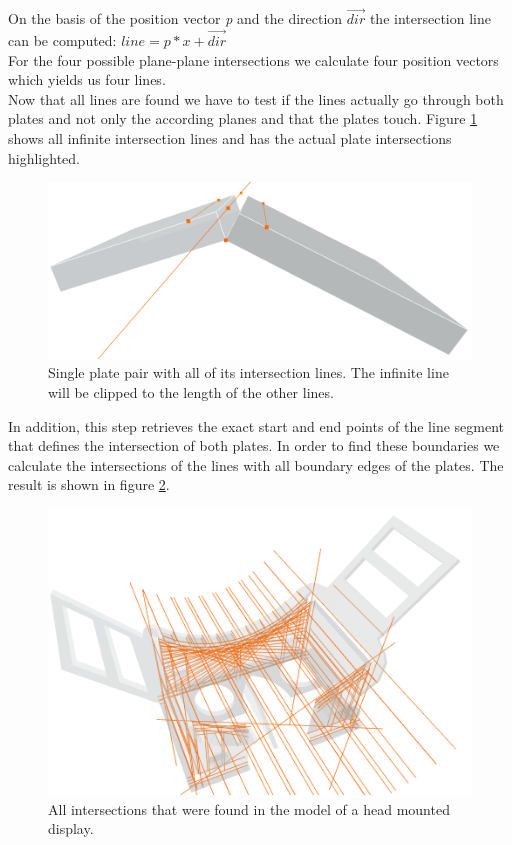\documentclass[../ClassicThesis.tex]{subfiles}
\begin{document}
On the basis of the position vector \emph{p} and the direction $\vec{dir}$ the intersection line can be computed: $ line = p*x + \vec{dir}$
\\
For the four possible plane-plane intersections we calculate four position vectors which yields us four lines.\\
Now that all lines are found we have to test if the lines actually go through both plates and not only the according planes and that the plates touch. Figure \ref{fig:infiniteIntersections} shows all infinite intersection lines and has the actual plate intersections highlighted.
\begin{figure}[!ht]
\centering
\includegraphics[width=1\columnwidth]{Images/06-1-graph-fourIntersectionLines.png}
\caption{Single plate pair with all of its intersection lines. The infinite line will be clipped to the length of the other lines.}
\label{fig:infiniteIntersections}
\end{figure}
In addition, this step retrieves the exact start and end points of the line segment that defines the intersection of both plates. In order to find these boundaries we calculate the intersections of the lines with all boundary edges of the plates. The result is shown in figure \ref{fig:allBoundaries}.\\
\begin{figure}[!ht]
\centering
\includegraphics[width=\columnwidth]{Images/AllIntersectionsHMD.png}
\caption{All intersections that were found in the model of a head mounted display. }
\label{fig:allBoundaries}
\end{figure}
\end{document}
